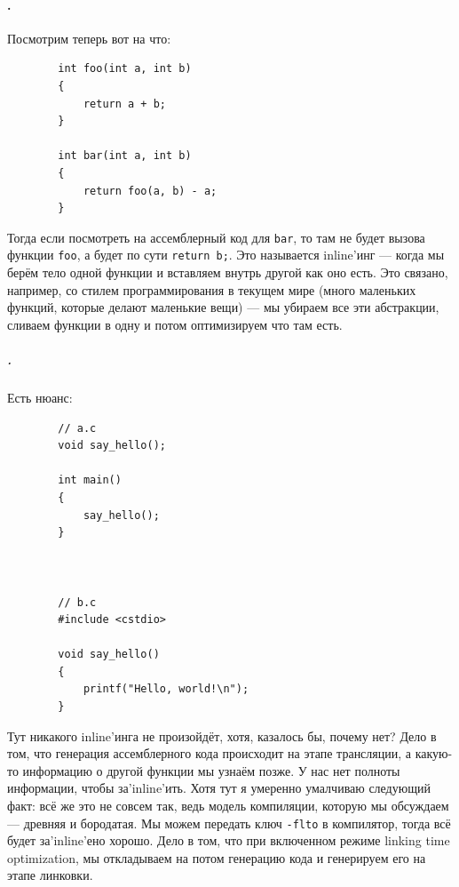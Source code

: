 \documentclass{article}
\begin{document}
    \paragraph{.}
    Посмотрим теперь вот на что:
    \begin{verbatim}
        int foo(int a, int b)
        {
            return a + b;
        }

        int bar(int a, int b)
        {
            return foo(a, b) - a;
        }
    \end{verbatim}
    Тогда если посмотреть на ассемблерный код для \texttt{bar}, то там не будет вызова функции \texttt{foo}, а будет по сути \texttt{return b;}. Это называется inline'инг --- когда мы берём тело одной функции и вставляем внутрь другой как оно есть. Это связано, например, со стилем программирования в текущем мире (много маленьких функций, которые делают маленькие вещи) --- мы убираем все эти абстракции, сливаем функции в одну и потом оптимизируем что там есть.
    \subparagraph{.}
    Есть нюанс:
    \begin{verbatim}
        // a.c
        void say_hello();

        int main()
        {
            say_hello();
        }



        // b.c
        #include <cstdio>

        void say_hello()
        {
            printf("Hello, world!\n");
        }
    \end{verbatim}
    Тут никакого inline'инга не произойдёт, хотя, казалось бы, почему нет? Дело в том, что генерация ассемблерного кода происходит на этапе трансляции, а какую-то информацию о другой функции мы узнаём позже. У нас нет полноты информации, чтобы за'inline'ить. Хотя тут я умеренно умалчиваю следующий факт: всё же это не совсем так, ведь модель компиляции, которую мы обсуждаем --- древняя и бородатая. Мы можем передать ключ \texttt{-flto} в компилятор, тогда всё будет за'inline'ено хорошо. Дело в том, что при включенном режиме linking time optimization, мы откладываем на потом генерацию кода и генерируем его на этапе линковки.
\end{document}

